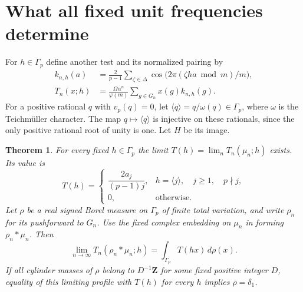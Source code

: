 \documentclass[11pt]{article}
\newtheorem{theorem}{Theorem}[section]
\newcommand{\Z}{\mathbf Z}
\begin{document}
\section{What all fixed unit frequencies determine}

For \(h\in\Gamma_p\) define another test and its normalized pairing by
\begin{align*}
 k_{n,h}(a)&=\frac{2}{p-1}\sum_{\zeta\in\Delta}
        \cos\bigl(2\pi(\zeta ha\bmod m)/m\bigr),\\
 T_n(x;h)&=\frac{\Omega\alpha^n}{\varphi(m)}
                   \sum_{g\in G_n}x(g) k_{n,h}(g).
\end{align*}
For a positive rational \(q\) with \(v_p(q)=0\), let
\(\langle q\rangle=q/\omega(q)\in\Gamma_p\), where \(\omega\) is the
Teichm\"uller character. The map \(q\mapsto\langle q\rangle\) is
injective on these rationals, since the only positive rational root of
unity is one. Let \(H\) be its image.

\begin{theorem}\label{thm:profile}
For every fixed \(h\in\Gamma_p\) the limit \(T(h)=\lim_nT_n(\mu_n;h)\)
exists. Its value is
\[
 T(h)=
 \begin{cases}
 \dfrac{2a_j}{(p-1)j},&
   h=\langle j\rangle,\quad j\ge1,\quad p\nmid j,\\[3pt]
 0,&\text{otherwise}.
 \end{cases}
\]
Let \(\rho\) be a real signed Borel measure on \(\Gamma_p\) of finite
total variation, and write \(\rho_n\) for its pushforward to \(G_n\).
Use the fixed complex embedding on \(\mu_n\) in forming
\(\rho_n*\mu_n\). Then
\[
 \lim_{n\to\infty} T_n(\rho_n*\mu_n;h)=
                 \int_{\Gamma_p}T(hx)\,d\rho(x).
\]
If all cylinder masses of \(\rho\) belong to \(D^{-1}\Z\) for some
fixed positive integer \(D\), equality of this limiting profile with
\(T(h)\) for every \(h\) implies \(\rho=\delta_1\).
\end{theorem}
\end{document}
